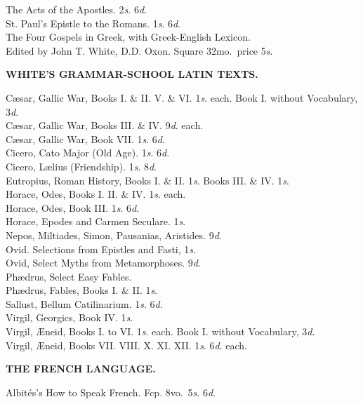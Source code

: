 \documentclass[letterpaper,12pt,oneside,openany]{memoir}
\newcommand{\D}{\hspace*{5mm}}
\begin{document}
\begin{footnotesize}
The Acts of the Apostles. 2\textit{s}. 6\textit{d}.\\
St. Paul's Epistle to the Romans. 1\textit{s}. 6\textit{d}.\\
The Four Gospels in Greek, with Greek-English Lexicon. \\
\D Edited by John T. White, D.D. Oxon. Square 32mo.\ price 5\textit{s}.
\begin{center}
\textbf{WHITE'S GRAMMAR-SCHOOL LATIN TEXTS.}
\end{center}
C{\ae}sar, Gallic War, Books I\@. \& II\@. V\@. \& VI\@. 1\textit{s}. each.
Book I. without Vocabulary, 3\textit{d}.\\
C{\ae}sar, Gallic War, Books III. \& IV. 9\textit{d}. each.\\
C{\ae}sar, Gallic War, Book VII. 1\textit{s}. 6\textit{d}.\\
Cicero, Cato Major (Old Age). 1\textit{s}. 6\textit{d}.\\
Cicero, L{\ae}lius (Friendship). 1\textit{s}. 8\textit{d}.\\
Eutropius, Roman History, Books I. \& II. 1\textit{s}. Books III. \& IV. 1\textit{s}.\\
Horace, Odes, Books I. II. \& IV. 1\textit{s}. each.\\
Horace, Odes, Book III. 1\textit{s}. 6\textit{d}.\\
Horace, Epodes and Carmen Seculare. 1\textit{s}.\\
Nepos, Miltiades, Simon, Pausanias, Aristides. 9\textit{d}.\\
Ovid. Selections from Epistles and Fasti, 1\textit{s}.\\
Ovid, Select Myths from Metamorphoses. 9\textit{d}.\\
Ph{\ae}drus, Select Easy Fables.\\
Ph{\ae}drus, Fables, Books I. \& II. 1\textit{s}.\\
Sallust, Bellum Catilinarium. 1\textit{s}. 6\textit{d}.\\
Virgil, Georgics, Book IV. 1\textit{s}.\\
Virgil, {\AE}neid, Books I. to VI. 1\textit{s}. each. Book I. without Vocabulary, 3\textit{d}.\\
Virgil, {\AE}neid, Books VII\@. VIII\@. X\@. XI\@. XII\@. 1\textit{s}. 6\textit{d}. each.
\begin{center}
\textbf{THE FRENCH LANGUAGE.}
\end{center}
Albit\'es's How to Speak French. Fcp. 8vo.\ 5\textit{s}. 6\textit{d}.\\

\end{footnotesize}
\end{document}
